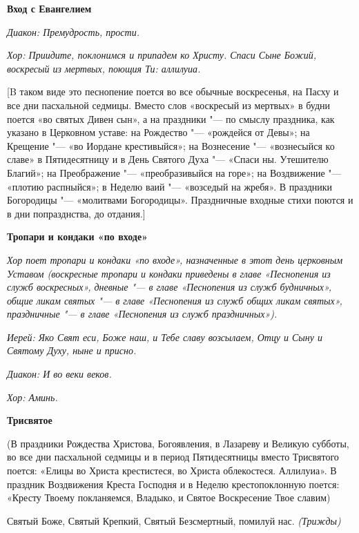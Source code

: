 \medskip


\bfseries Вход с Евангелием \normalfont{}\nopagebreak


\itshape Диакон:\normalfont{} Премудрость, прости.


\itshape  Хор:\normalfont{} Приидите, поклонимся и припадем ко Христу. Спаси Сыне Божий, воскресый из мертвых, поющия Ти: аллилуиа.


[B таком виде это песнопение поется во все обычные воскресенья, на Пасху и все дни пасхальной седмицы. Вместо слов «воскресый из мертвых» в будни поется «во святых Дивен сын», а на праздники "--- по смыслу праздника, как указано в Церковном уставе: на Рождество "--- «рождейся от Девы»; на Крещение "--- «во Иордане крестивыйся»; на Вознесение "--- «вознесыйся ко славе» в Пятидесятницу и в День Святого Духа "--- «Спаси ны. Утешителю Благий»; на Преображение "--- «преобразивыйся на горе»; на Воздвижение "--- «плотию распныйся»; в Неделю ваий "--- «возседый на жребя». В праздники Богородицы "--- «молитвами Богородицы». Праздничные входные стихи поются и в дни попразднства, до отдания.]


\medskip
\bfseries Тропари и кондаки «по входе» \normalfont{}\nopagebreak


\itshape Хор поет тропари и кондаки «по входе», назначенные в этот день церковным Уставом (воскресные тропари и кондаки приведены в главе «Песнопения из служб воскресных», дневные "--- в главе «Песнопения из служб будничных», общие ликам святых "--- в главе «Песнопения из служб общих ликам святых», праздничные "--- в главе «Песнопения из служб праздничных»).\normalfont{}


\itshape Иерей:\normalfont{} Яко Свят еси, Боже наш, и Тебе славу возсылаем, Отцу и Сыну и Святому Духу, ныне и присно.


\itshape Диакон:\normalfont{} И во веки веков.


\itshape Хор:\normalfont{} Аминь.




\medskip


\bfseries Трисвятое \normalfont{}\nopagebreak


(В праздники Рождества Христова, Богоявления, в Лазареву и Великую субботы, во все дни пасхальной седмицы и в период Пятидесятницы вместо Трисвятого поется: «Елицы во Христа крестистеся, во Христа облекостеся. Аллилуиа». В праздник Воздвижения Креста Господня и в Неделю крестопоклонную поется: «Кресту Твоему покланяемся, Владыко, и Святое Воскресение Твое славим)


Святый Боже, Святый Крепкий, Святый Безсмертный, помилуй нас. \itshape (Трижды)\normalfont{}



